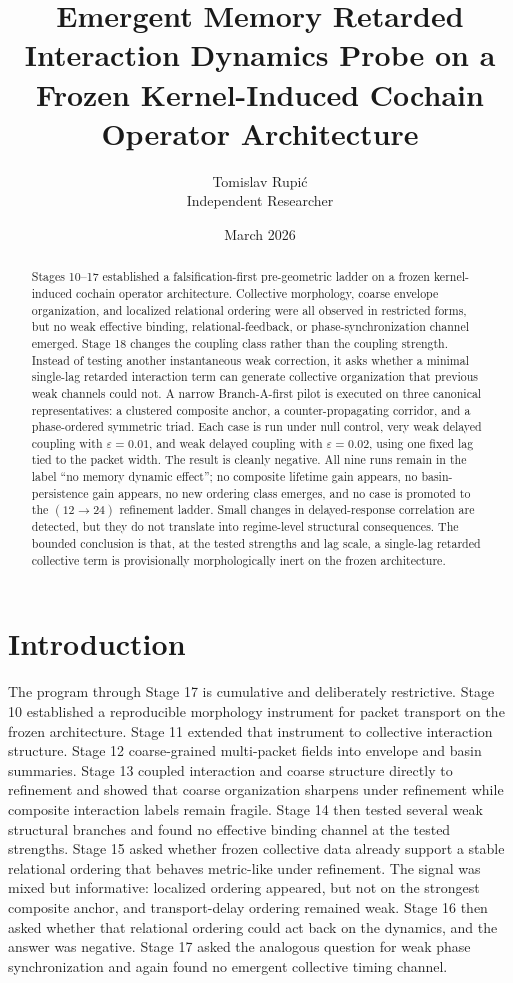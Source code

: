 \documentclass[11pt]{article}
\title{Emergent Memory Retarded Interaction Dynamics Probe on a Frozen Kernel-Induced Cochain Operator Architecture}
\author{Tomislav Rupi\'c \\ Independent Researcher}
\date{March 2026}
\begin{document}
\maketitle

\begin{abstract}
Stages 10--17 established a falsification-first pre-geometric ladder on a frozen kernel-induced cochain operator architecture. Collective morphology, coarse envelope organization, and localized relational ordering were all observed in restricted forms, but no weak effective binding, relational-feedback, or phase-synchronization channel emerged. Stage 18 changes the coupling class rather than the coupling strength. Instead of testing another instantaneous weak correction, it asks whether a minimal single-lag retarded interaction term can generate collective organization that previous weak channels could not. A narrow Branch-A-first pilot is executed on three canonical representatives: a clustered composite anchor, a counter-propagating corridor, and a phase-ordered symmetric triad. Each case is run under null control, very weak delayed coupling with $\varepsilon=0.01$, and weak delayed coupling with $\varepsilon=0.02$, using one fixed lag tied to the packet width. The result is cleanly negative. All nine runs remain in the label ``no memory dynamic effect''; no composite lifetime gain appears, no basin-persistence gain appears, no new ordering class emerges, and no case is promoted to the $(12 \rightarrow 24)$ refinement ladder. Small changes in delayed-response correlation are detected, but they do not translate into regime-level structural consequences. The bounded conclusion is that, at the tested strengths and lag scale, a single-lag retarded collective term is provisionally morphologically inert on the frozen architecture.
\end{abstract}

\section{Introduction}

The program through Stage 17 is cumulative and deliberately restrictive. Stage 10 established a reproducible morphology instrument for packet transport on the frozen architecture. Stage 11 extended that instrument to collective interaction structure. Stage 12 coarse-grained multi-packet fields into envelope and basin summaries. Stage 13 coupled interaction and coarse structure directly to refinement and showed that coarse organization sharpens under refinement while composite interaction labels remain fragile. Stage 14 then tested several weak structural branches and found no effective binding channel at the tested strengths. Stage 15 asked whether frozen collective data already support a stable relational ordering that behaves metric-like under refinement. The signal was mixed but informative: localized ordering appeared, but not on the strongest composite anchor, and transport-delay ordering remained weak. Stage 16 then asked whether that relational ordering could act back on the dynamics, and the answer was negative. Stage 17 asked the analogous question for weak phase synchronization and again found no emergent collective timing channel.
\end{document}
